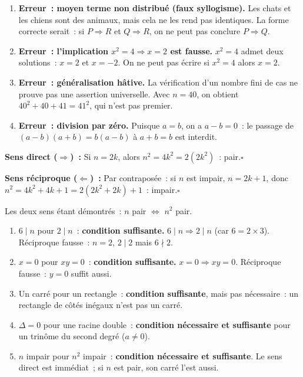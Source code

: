 
\begin{enumerate}
  \item \textbf{Erreur~: moyen terme non distribu\'e (faux syllogisme).}
        Les chats et les chiens sont des animaux, mais cela ne les rend pas identiques.
        La forme correcte serait~: si $P\Rightarrow R$ et $Q\Rightarrow R$, on ne peut pas
        conclure $P\Rightarrow Q$.
  \item \textbf{Erreur~: l'implication $x^2=4\Rightarrow x=2$ est fausse.}
        $x^2=4$ admet deux solutions~: $x=2$ et $x=-2$. On ne peut pas \'ecrire
        \og si $x^2=4$ alors $x=2$\fg.
  \item \textbf{Erreur~: g\'en\'eralisation h\^ative.}
        La v\'erification d'un nombre fini de cas ne prouve pas une assertion universelle.
        Avec $n=40$, on obtient $40^2+40+41=41^2$, qui n'est pas premier.
  \item \textbf{Erreur~: division par z\'ero.}
        Puisque $a=b$, on a $a-b=0$~: le passage de
        $(a-b)(a+b)=b(a-b)$ \`a $a+b=b$ est interdit.
\end{enumerate}


\textbf{Sens direct ($\Rightarrow$)~:} Si $n=2k$, alors $n^2=4k^2=2(2k^2)$~: pair.\hfill$\square$

\textbf{Sens r\'eciproque ($\Leftarrow$)~:} Par contrapos\'ee~: si $n$ est impair,
$n=2k+1$, donc $n^2=4k^2+4k+1=2(2k^2+2k)+1$~: impair.\hfill$\square$

Les deux sens \'etant d\'emontr\'es~: $n$ pair $\Leftrightarrow$ $n^2$ pair.


\begin{enumerate}
  \item $6\mid n$ pour $2\mid n$~: \textbf{condition suffisante.}
        $6\mid n\Rightarrow2\mid n$ (car $6=2\times3$).
        R\'eciproque fausse~: $n=2$, $2\mid2$ mais $6\nmid2$.
  \item $x=0$ pour $xy=0$~: \textbf{condition suffisante.}
        $x=0\Rightarrow xy=0$. R\'eciproque fausse~: $y=0$ suffit aussi.
  \item Un carr\'e pour un rectangle~: \textbf{condition suffisante},
        mais pas n\'ecessaire~: un rectangle de c\^ot\'es in\'egaux n'est pas un carr\'e.
  \item $\Delta=0$ pour une racine double~: \textbf{condition n\'ecessaire
        et suffisante} pour un trin\^ome du second degr\'e ($a\ne0$).
  \item $n$ impair pour $n^2$ impair~: \textbf{condition n\'ecessaire et suffisante}.
        Le sens direct est imm\'ediat~; si $n$ est pair, son carr\'e l'est aussi.
\end{enumerate}

